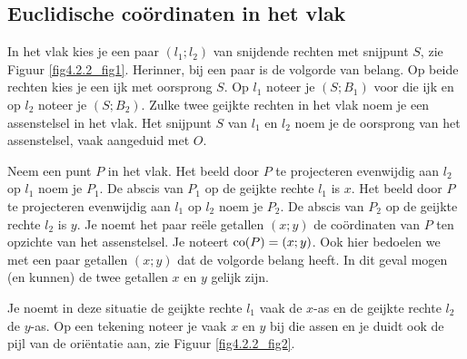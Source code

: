 \subsection{Euclidische co\"ordinaten in het vlak}

In het vlak kies je een paar $(l_1;l_2)$ van snijdende rechten met snijpunt $S$, zie Figuur \ref{fig4.2.2_fig1}.
Herinner, bij een paar is de volgorde van belang.
Op beide rechten kies je een ijk met oorsprong $S$.
Op $l_1$ noteer je $(S;B_1)$ voor die ijk en op $l_2$ noteer je $(S;B_2)$.
Zulke twee geijkte rechten in het vlak noem je een assenstelsel in het vlak.
Het snijpunt $S$ van $l_1$ en $l_2$ noem je de oorsprong van het assenstelsel, vaak aangeduid met $O$.



Neem een punt $P$ in het vlak.
Het beeld door $P$ te projecteren evenwijdig aan $l_2$ op $l_1$ noem je $P_1$.
De abscis van $P_1$  op de geijkte rechte $l_1$ is $x$.
Het beeld door $P$ te projecteren evenwijdig aan $l_1$ op $l_2$ noem je $P_2$.
De abscis van $P_2$ op de geijkte rechte $l_2$ is $y$.
Je noemt het paar re\"ele getallen $(x;y)$ de co\"ordinaten van $P$ ten opzichte van het assenstelsel.
Je noteert $\operatorname{co} (P)=(x;y)$.
Ook hier bedoelen we met een paar getallen $(x;y)$ dat de volgorde belang heeft.
In dit geval mogen (en kunnen) de twee getallen $x$ en $y$ gelijk zijn.

Je noemt in deze situatie de geijkte rechte $l_1$ vaak de $x$-as en de geijkte rechte $l_2$ de $y$-as.
Op een tekening noteer je vaak $x$ en $y$ bij die assen en je duidt ook de pijl van de ori\"entatie aan, zie Figuur \ref{fig4.2.2_fig2}.




